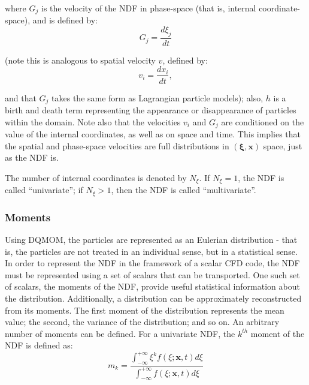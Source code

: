 \noindent where $G_{j}$ is the velocity of the NDF in phase-space (that is, internal coordinate-space), and is defined by:
\begin{equation}
G_{j} = \dfrac{ d \xi_{j} }{d t}
\end{equation}

\noindent (note this is analogous to spatial velocity $v$, defined by:
\begin{equation}
v_{i} = \dfrac{ d x_{i} }{d t},
\end{equation}

\noindent and that $G_{j}$ takes the same form as Lagrangian particle models); also, $h$ is a birth and death term representing the appearance or disappearance of particles within the domain.  Note also that the velocities $v_i$ and $G_j$ are conditioned on the value of the internal coordinates, as well as on space and time. This implies that the spatial and phase-space velocities are full distributions in $\left( \boldsymbol{\xi}, \boldsymbol{x} \right)$ space, just as the NDF is.

The number of internal coordinates is denoted by $N_{\xi}$. If $N_{\xi} = 1$, the NDF is called ``univariate''; if $N_{\xi} > 1$, then the NDF is called ``multivariate''.



\subsubsection{Moments}\label{subsubsec:moments}
Using DQMOM, the particles are represented as an Eulerian distribution - that is, the particles are not treated in an individual sense, but in a statistical sense. In order to represent the NDF in the framework of a scalar CFD code, the NDF must be represented using a set of scalars that can be transported. One such set of scalars, the moments of the NDF, provide useful statistical information about the distribution. Additionally, a distribution can be approximately reconstructed from its moments. The first moment of the distribution represents the mean value; the second, the variance of the distribution; and so on. An arbitrary number of moments can be defined. For a univariate NDF, the $k^{th}$ moment of the NDF is defined as:
\begin{equation}\label{eq:univariate moment definition}
m_{k} = \dfrac{ \displaystyle{ \int_{-\infty}^{+\infty}{\xi^k f \left( \xi ; \boldsymbol{x},t \right) d\xi } } }{ \displaystyle{ \int_{-\infty}^{+\infty}{ f \left( \xi ; \boldsymbol{x},t \right) d\xi } } }
\end{equation}

